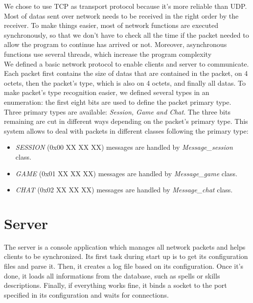 \documentclass{scrreprt}
\begin{document}
				We chose to use TCP as transport protocol because it's more reliable than UDP. Most of datas sent over network needs to be received in the right order by the receiver. To make things easier, most of network functions are executed synchronously, so that we don't have to check all the time if the packet needed to allow the program to continue has arrived or not. Moreover, asynchronous functions use several threads, which increase the program complexity\\

				We defined a basic network protocol to enable clients and server to communicate. Each packet first contains the size of datas that are contained in the packet, on 4 octets, then the packet's type, which is also on 4 octets, and finally all datas. To make packet's type recognition easier, we defined several types in an enumeration: the first eight bits are used to define the packet primary type. Three primary types are available: \emph{Session, Game and Chat}. The three bits remaining are cut in different ways depending on the packet's primary type. This system allows to deal with packets in different classes following the primary type:
				\begin{itemize}
				\item{\emph{SESSION} (0x00 XX XX XX) messages are handled by \emph{Message\_session} class.}
				\item{\emph{GAME} (0x01 XX XX XX) messages are handled by \emph{Message\_game} class.}
				\item{\emph{CHAT} (0x02 XX XX XX) messages are handled by \emph{Message\_chat} class.}
				\end{itemize}

				\section{Server}
				The server is a console application which manages all network packets and helps clients to be synchronized. Its first task during start up is to get its configuration files and parse it. Then, it creates a log file based on its configuration. Once it's done, it loads all informations from the database, such as spells or skills descriptions. Finally, if everything works fine, it binds a socket to the port specified in its configuration and waits for connections.
\end{document}
